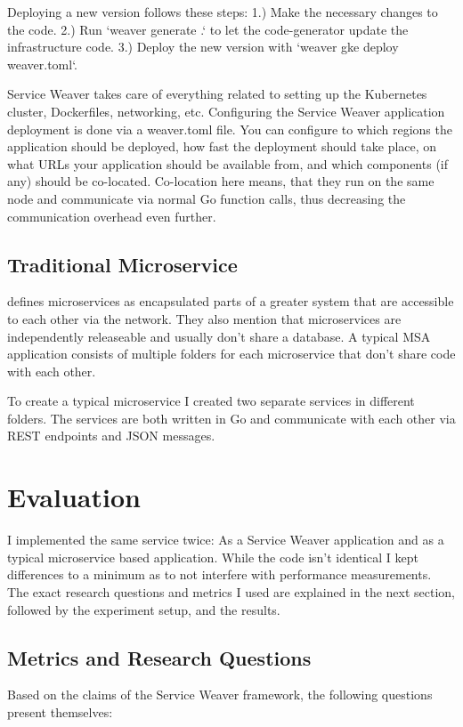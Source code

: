 \documentclass[sigconf,review,9pt]{acmart}
\begin{document}
Deploying a new version follows these steps:
1.) Make the necessary changes to the code.
2.) Run `weaver generate .` to let the code-generator update the infrastructure code.
3.) Deploy the new version with `weaver gke deploy weaver.toml`.

Service Weaver takes care of everything related to setting up the Kubernetes cluster,
Dockerfiles, networking, etc.
Configuring the Service Weaver application deployment is done via a weaver.toml file.
You can configure to which regions the application should be deployed, how fast the
deployment should take place, on what URLs your application should be available from,
and which components (if any) should be co-located.
Co-location here means, that they run on the same node and communicate via normal
Go function calls, thus decreasing the communication overhead even further.

\subsection{Traditional Microservice}

 defines microservices as encapsulated parts
of a greater system that are accessible to each other via the network.
They also mention that microservices are independently releaseable and usually
don't share a database.
A typical MSA application consists of multiple folders for each microservice
that don't share code with each other.

To create a typical microservice I created two separate services in different folders.
The services are both written in Go and communicate with each other via REST endpoints and JSON messages.

\section{Evaluation}

I implemented the same service twice: As a Service Weaver application and as a typical
microservice based application.
While the code isn't identical I kept differences to a minimum as to not interfere
with performance measurements.
The exact research questions and metrics I used are explained in the next section,
followed by the experiment setup, and the results.

\subsection{Metrics and Research Questions}
Based on the claims of the Service Weaver framework, the following questions
present themselves:
\end{document}

